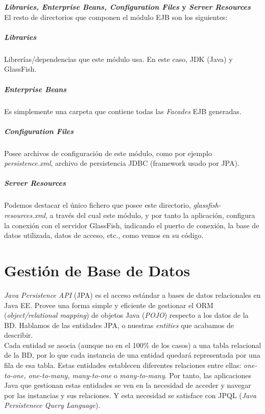 \textbf{\textit{Libraries, Enterprise Beans, Configuration Files} y \textit{Server Resources}}
\\

El resto de directorios que componen el módulo EJB son los siguientes:

\subparagraph{\textit{Libraries}}

Librerías/dependencias que este módulo usa. En este caso, JDK (Java) y GlassFish. \\

\subparagraph{\textit{Enterprise Beans}} 

Es simplemente una carpeta que contiene todas las \textit{Facades} EJB generadas. \\

\subparagraph{\textit{Configuration Files}} 

Posee archivos de configuración de este módulo, como por ejemplo \textit{persistence.xml}, archivo de persistencia JDBC (framework usado por JPA).

\subparagraph{\textit{Server Resources}} 

Podemos destacar el único fichero que posee este directorio, \textit{glassfish-resources.xml}, a través del cual este módulo, y por tanto la aplicación, configura la conexión con el servidor GlassFish, indicando el puerto de conexión, la base de datos utilizada, datos de acceso, etc., como vemos en su código.




\section{Gestión de Base de Datos} \label{sec:gestion-bd}

\textit{Java Persistence API} (JPA) es el acceso estándar a bases de datos relacionales en Java EE. Provee una forma simple y eficiente de gestionar el ORM (\textit{object/relational mapping}) de objetos Java (\textit{POJO}) respecto a los datos de la BD. Hablamos de las entidades JPA, o nuestras \textit{entities} que acabamos de describir. \\

Cada entidad se asocia (aunque no en el 100\% de los casos) a una tabla relacional de la BD, por lo que cada instancia de una entidad quedará representada por una fila de esa tabla. Estas entidades establecen diferentes relaciones entre ellas: \textit{one-to-one, one-to-many, many-to-one} o \textit{many-to-many}. Por tanto, las aplicaciones Java que gestionan estas entidades se ven en la necesidad de acceder y navegar por las instancias y sus relaciones. Y esta necesidad se satisface con JPQL (\textit{Java Persistenece Query Language}).\\

